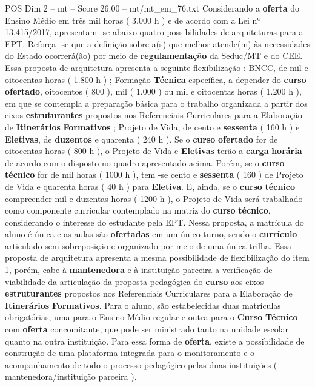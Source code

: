 \begin{textsample}{POS Dim 2 – mt – Score 26.00 – mt/mt\_em\_76.txt}
Considerando a \textbf{oferta} do Ensino Médio em três mil horas ( 3.000 h ) e de acordo com a Lei nº 13.415/2017, apresentam -se abaixo quatro possibilidades de arquiteturas para a EPT.
Reforça -se que a definição sobre a(s) que melhor atende(m) às necessidades do Estado ocorrerá(ão) por meio de \textbf{regulamentação} da Seduc/MT e do CEE.
Essa proposta de arquitetura apresenta a seguinte flexibilização : BNCC, de mil e oitocentas horas ( 1.800 h ) ; Formação \textbf{Técnica} específica, a depender do \textbf{curso} \textbf{ofertado}, oitocentos ( 800 ), mil ( 1.000 ) ou mil e oitocentas horas ( 1.200 h ), em que se contempla a preparação básica para o trabalho organizada a partir dos eixos \textbf{estruturantes} propostos nos Referenciais Curriculares para a Elaboração de \textbf{Itinerários} \textbf{Formativos} ; Projeto de Vida, de cento e \textbf{sessenta} ( 160 h ) e \textbf{Eletivas}, de \textbf{duzentos} e quarenta ( 240 h ).
Se o \textbf{curso} \textbf{ofertado} for de oitocentas horas ( 800 h ), o Projeto de Vida e \textbf{Eletivas} terão a \textbf{carga} \textbf{horária} de acordo com o disposto no quadro apresentado acima.
Porém, se o \textbf{curso} \textbf{técnico} for de mil horas ( 1000 h ), tem -se cento e \textbf{sessenta} ( 160 ) de Projeto de Vida e quarenta horas ( 40 h ) para \textbf{Eletiva}.
E, ainda, se o \textbf{curso} \textbf{técnico} compreender mil e duzentas horas ( 1200 h ), o Projeto de Vida será trabalhado como componente curricular contemplado na matriz do \textbf{curso} \textbf{técnico}, considerando o interesse do estudante pela EPT.
Nessa proposta, a matrícula do aluno é única e as aulas são \textbf{ofertadas} em um único turno, sendo o \textbf{currículo} articulado sem sobreposição e organizado por meio de uma única trilha.
Essa proposta de arquitetura apresenta a mesma possibilidade de flexibilização do item 1, porém, cabe à \textbf{mantenedora} e à instituição parceira a verificação de viabilidade da articulação da proposta pedagógica do \textbf{curso} aos eixos \textbf{estruturantes} propostos nos Referenciais Curriculares para a Elaboração de \textbf{Itinerários} \textbf{Formativos}.
Para o aluno, são estabelecidas duas matrículas obrigatórias, uma para o Ensino Médio regular e outra para o \textbf{Curso} \textbf{Técnico} com \textbf{oferta} concomitante, que pode ser ministrado tanto na unidade escolar quanto na outra instituição.
Para essa forma de \textbf{oferta}, existe a possibilidade de construção de uma plataforma integrada para o monitoramento e o acompanhamento de todo o processo pedagógico pelas duas instituições ( mantenedora/instituição parceira ).

\end{textsample}

